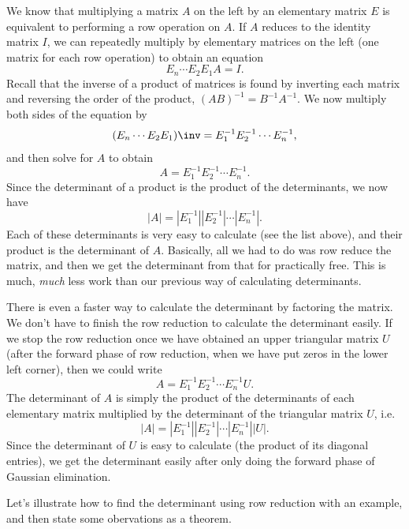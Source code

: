 We know that multiplying a matrix $A$ on the left by an elementary matrix $E$ is equivalent to performing a row operation on $A$. 
If $A$ reduces to the identity matrix $I$, we can repeatedly multiply by elementary matrices on the left (one matrix for each row operation) to obtain an equation $$E_n \cdots E_2E_1A=I.$$ 
Recall that the inverse of a product of matrices is found by inverting each matrix and reversing the order of the product, $(AB)^{-1} = B^{-1}A^{-1}$. 
We now multiply both sides of the equation by  
$$(E_n \cdots E_2E_1)\inv = E_1^{-1}E_2^{-1}\cdots E_n^{-1},$$ 
%
and then solve for $A$ to obtain 
$$A=E_1^{-1}E_2^{-1}\cdots E_n^{-1}.$$  
Since the determinant of a product is the product of the determinants, we now have 
$$|A|=|E_1^{-1}||E_2^{-1}|\cdots |E_n^{-1}|.$$ 
Each of these determinants is very easy to calculate (see the list above), and their product is the determinant of $A$.  Basically, all we had to do was row reduce the matrix, and then we get the determinant from that for practically free.  This is much, \emph{much} less work than our previous way of calculating determinants.

There is even a faster way to calculate the determinant by factoring the matrix.  We don't have to finish the row reduction to calculate the determinant easily.  If we stop the row reduction once we have obtained an upper triangular matrix $U$ (after the forward phase of row reduction, when we have put zeros in the lower left corner), then we could write $$A=E_1^{-1}E_2^{-1}\cdots E_n^{-1}U.$$  The determinant of $A$ is simply the product of the determinants of each elementary matrix multiplied by the determinant of the triangular matrix $U$, i.e. $$|A|=|E_1^{-1}||E_2^{-1}|\cdots |E_n^{-1}| |U|.$$  
Since the determinant of $U$ is easy to calculate (the product of its diagonal entries), we get the determinant easily after only doing the forward phase of Gaussian elimination.

Let's illustrate how to find the determinant using row reduction with an example, and then state some obervations as a theorem.

